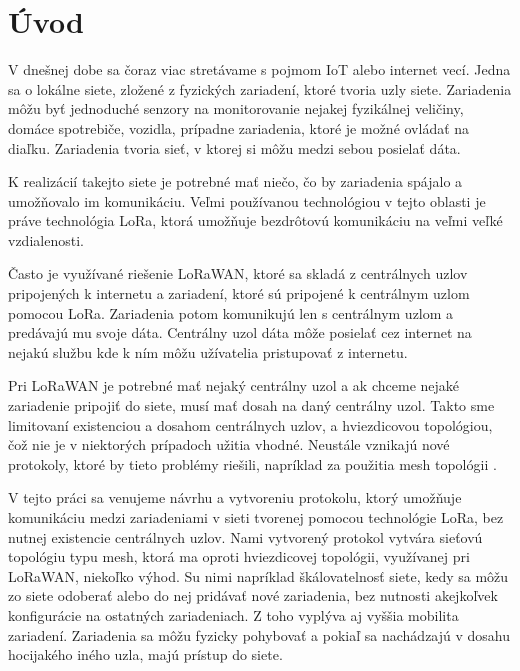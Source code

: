 \documentclass[slovak,master]{diploma}
\begin{document}
\MakeTitlePages

\listoffigures
\clearpage

\listoftables
\clearpage

\chapter{Úvod}
V dnešnej dobe sa čoraz viac stretávame s pojmom IoT alebo internet vecí. Jedna sa o lokálne siete, zložené z fyzických zariadení, ktoré tvoria uzly siete.
Zariadenia môžu byť jednoduché senzory na monitorovanie nejakej fyzikálnej veličiny, domáce spotrebiče, vozidla, prípadne 
zariadenia, ktoré je možné ovládať na diaľku. Zariadenia tvoria sieť, v ktorej si môžu medzi sebou posielať 
dáta.

K realizácií takejto siete je potrebné mať niečo, čo by zariadenia spájalo a umožňovalo im komunikáciu. Veľmi používanou technológiou
v tejto oblasti je práve technológia LoRa, ktorá umožňuje bezdrôtovú komunikáciu na veľmi veľké vzdialenosti.

Často je využívané riešenie LoRaWAN, ktoré sa skladá z centrálnych uzlov pripojených k internetu a zariadení, ktoré sú pripojené k centrálnym uzlom pomocou LoRa. 
Zariadenia potom komunikujú len s centrálnym uzlom a predávajú mu svoje dáta. Centrálny uzol dáta môže posielať cez internet na nejakú službu kde 
k ním môžu užívatelia pristupovať z internetu.

Pri LoRaWAN je potrebné mať nejaký centrálny uzol a ak chceme nejaké zariadenie pripojiť do siete, musí mať dosah na daný centrálny uzol. 
Takto sme limitovaní existenciou a dosahom centrálnych uzlov, a hviezdicovou topológiou, čož nie je v niektorých prípadoch užitia vhodné. Neustále vznikajú nové 
protokoly, ktoré by tieto problémy riešili, napríklad za použitia mesh topológii \cite{9385408}.

V tejto práci sa venujeme návrhu a vytvoreniu protokolu, ktorý umožňuje komunikáciu medzi zariadeniami v sieti tvorenej pomocou technológie LoRa,
bez nutnej existencie centrálnych uzlov. Nami vytvorený protokol vytvára sieťovú topológiu typu mesh, ktorá ma oproti hviezdicovej topológii, 
využívanej pri LoRaWAN, niekoľko výhod. Su nimi napríklad škálovatelnosť siete, kedy sa môžu zo siete odoberať alebo do nej pridávať nové zariadenia, 
bez nutnosti akejkoľvek konfigurácie na ostatných zariadeniach. Z toho vyplýva aj vyššia mobilita zariadení. Zariadenia sa môžu fyzicky pohybovať a 
pokiaľ sa nachádzajú v dosahu hocijakého iného uzla, majú prístup do siete.
\end{document}
